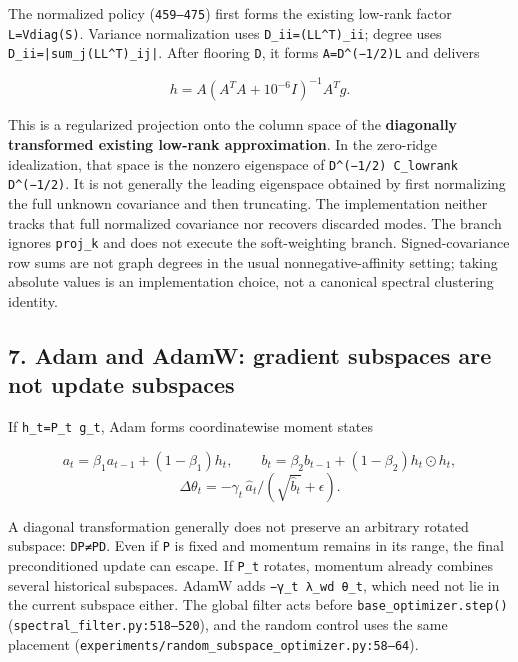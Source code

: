 \documentclass[
  british,
  10pt,
  a4paper,
]{article}
\begin{document}
The normalized policy (\texttt{459–475}) first forms the existing
low-rank factor \texttt{L=Vdiag(S)}. Variance normalization uses
\texttt{D\_\allowbreak{}ii=\allowbreak{}(LL\textasciicircum{}T)\_\allowbreak{}ii};
degree uses
\texttt{D\_\allowbreak{}ii=\allowbreak{}|sum\_\allowbreak{}j(LL\textasciicircum{}T)\_\allowbreak{}ij|}.
After flooring \texttt{D}, it forms
\texttt{A=\allowbreak{}D\textasciicircum{}(−1/\allowbreak{}2)L} and
delivers

\[
h=A(A^TA+10^{-6}I)^{-1}A^Tg.
\]

This is a regularized projection onto the column space of the
\textbf{diagonally transformed existing low-rank approximation}. In the
zero-ridge idealization\allowbreak{},\allowbreak{} that space is the
nonzero eigenspace of
\texttt{D\textasciicircum{}(−1/\allowbreak{}2) \allowbreak{}C\_\allowbreak{}lowrank \allowbreak{}D\textasciicircum{}(−1/\allowbreak{}2)}.
It is not generally the leading eigenspace obtained by first normalizing
the full unknown covariance and then truncating.\allowbreak{} The
implementation neither tracks that full normalized covariance nor
recovers discarded modes. The branch ignores \texttt{proj\_k} and does
not execute the soft-\allowbreak{}weighting branch.
Signed-\allowbreak{}covariance row sums are not graph degrees in the
usual nonnegative-\allowbreak{}affinity setting; taking absolute values
is an implementation choice, not a canonical spectral clustering
identity.

\subsection{7. Adam and AdamW: gradient subspaces are not update
subspaces}\label{mathematical-audit--adam-and-adamw-gradient-subspaces-are-not-update-subspaces}

If
\texttt{h\_\allowbreak{}t=\allowbreak{}P\_\allowbreak{}t \allowbreak{}g\_\allowbreak{}t},
Adam forms coordinatewise moment states

\[
a_t=\beta_1a_{t-1}+(1-\beta_1)h_t,\qquad
b_t=\beta_2b_{t-1}+(1-\beta_2)h_t\odot h_t,
\] \[
\Delta\theta_t=-\gamma_t\,\widehat a_t/(\sqrt{\widehat b_t}+\epsilon).
\]

A diagonal transformation generally does not preserve an arbitrary
rotated subspace: \texttt{DP≠PD}. Even if \texttt{P} is fixed and
momentum remains in its range, the final preconditioned update can
escape. If \texttt{P\_t} rotates, momentum already combines several
historical subspaces. AdamW adds
\texttt{−γ\_\allowbreak{}t \allowbreak{}λ\_\allowbreak{}wd \allowbreak{}θ\_\allowbreak{}t},
which need not lie in the current subspace either. The global filter
acts before \texttt{base\_\allowbreak{}optimizer.\allowbreak{}step()}
(\texttt{spectral\_\allowbreak{}filter.\allowbreak{}py:\allowbreak{}518–520}),
and the random control uses the same placement
(\texttt{experiments/\allowbreak{}random\_\allowbreak{}subspace\_\allowbreak{}optimizer.\allowbreak{}py:\allowbreak{}58–64}).
\end{document}

